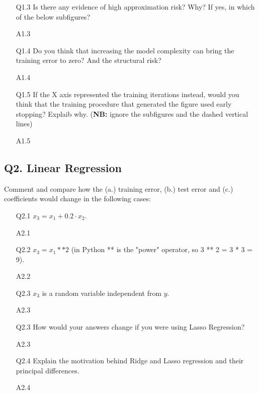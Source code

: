 \documentclass[unicode, 11pt, a4paper]{scrartcl}
\begin{document}
\begin{itemize}
	\item[Q1.3] Is there any evidence of high approximation risk? Why?
	      If yes, in which of the below subfigures?
	\item[A1.3] ~\\

	\item[Q1.4] Do you think that increasing the model complexity can bring the training error to zero?
	      And the structural risk?
	\item[A1.4] ~\\

	\item[Q1.5] If the X axis represented the training iterations instead,
	      would you think that the training procedure that generated the figure used early stopping?
	      Explaib why. (\textbf{NB:} ignore the subfigures and the dashed vertical lines)
	\item[A1.5] ~\\

\end{itemize}

\subsection*{Q2. Linear Regression}
Comment and compare how the (a.) training error, (b.) test error and (c.) coefficients would change in the following cases:
\begin{itemize}
	\item[Q2.1] $x_3 = x_1 + 0.2 \cdot x_2$.
	\item[A2.1] ~\\

	\item[Q2.2] $x_3 = x_1 ** 2$ (in Python ** is the "power" operator, so  3 ** 2 = 3 * 3 = 9).
	\item[A2.2] ~\\

	\item[Q2.3] $x_3$ is a random variable independent from $y$.
	\item[A2.3] ~\\

	\item[Q2.3] How would your answers change if you were using Lasso Regression?
	\item[A2.3] ~\\

	\item[Q2.4] Explain the motivation behind Ridge and Lasso regression and their principal differences.
	\item[A2.4] ~\\
\end{itemize}
\end{document}
